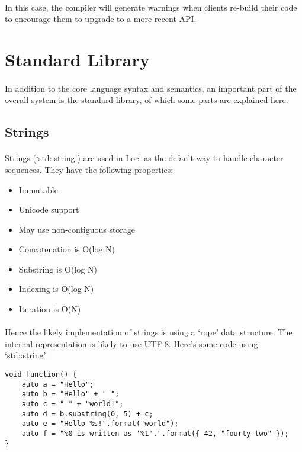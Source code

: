 \documentclass[12pt,twoside,notitlepage]{report}
\begin{document}
\paragraph{}
In this case, the compiler will generate warnings when clients re-build their code to encourage them to upgrade to a more recent API.

\clearpage

\section{Standard Library}

\paragraph{}
In addition to the core language syntax and semantics, an important part of the overall system is the standard library, of which some parts are explained here.

\subsection{Strings}

\paragraph{}
Strings (`std::string') are used in Loci as the default way to handle character sequences. They have the following properties:

\begin{itemize}
\item Immutable
\item Unicode support
\item May use non-contiguous storage
\item Concatenation is O(log N)
\item Substring is O(log N)
\item Indexing is O(log N)
\item Iteration is O(N)
\end{itemize}

\paragraph{}
Hence the likely implementation of strings is using a `rope' data structure. The internal representation is likely to use UTF-8. Here's some code using `std::string':

\begin{lstlisting}
void function() {
	auto a = "Hello";
	auto b = "Hello" + " ";
	auto c = " " + "world!";
	auto d = b.substring(0, 5) + c;
	auto e = "Hello %s!".format("world");
	auto f = "%0 is written as '%1'.".format({ 42, "fourty two" });
}
\end{lstlisting}
\end{document}
